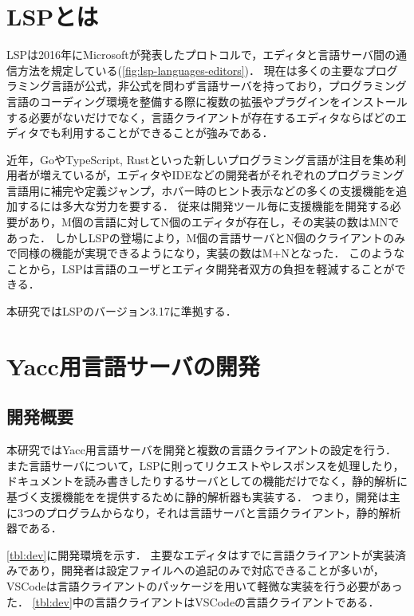 \documentclass[fontsize=9bp,twocolumn,column_gap=2.36zw,a4paper,report]{jlreq}
\begin{document}
\begin{figure}[h]
\end{figure}

\chapter{LSPとは}

LSPは2016年にMicrosoftが発表したプロトコルで，エディタと言語サーバ間の通信方法を規定している(\ref{fig:lsp-languages-editors})．
現在は多くの主要なプログラミング言語が公式，非公式を問わず言語サーバを持っており\cite{lsp_impl}，プログラミング言語のコーディング環境を整備する際に複数の拡張やプラグインをインストールする必要がないだけでなく，言語クライアントが存在するエディタならばどのエディタでも利用することができることが強みである．\par
近年，GoやTypeScript, Rustといった新しいプログラミング言語が注目を集め利用者が増えているが，エディタやIDEなどの開発者がそれぞれのプログラミング言語用に補完や定義ジャンプ，ホバー時のヒント表示などの多くの支援機能を追加するには多大な労力を要する．
従来は開発ツール毎に支援機能を開発する必要があり，M個の言語に対してN個のエディタが存在し，その実装の数はM\times Nであった．
しかしLSPの登場により，M個の言語サーバとN個のクライアントのみで同様の機能が実現できるようになり，実装の数はM+Nとなった．
このようなことから，LSPは言語のユーザとエディタ開発者双方の負担を軽減することができる．\par
本研究ではLSPのバージョン3.17に準拠する．
\newline

\chapter{Yacc用言語サーバの開発}
\section{開発概要}

本研究ではYacc用言語サーバを開発と複数の言語クライアントの設定を行う．
また言語サーバについて，LSPに則ってリクエストやレスポンスを処理したり，ドキュメントを読み書きしたりするサーバとしての機能だけでなく，静的解析に基づく支援機能をを提供するために静的解析器も実装する．
つまり，開発は主に3つのプログラムからなり，それは言語サーバと言語クライアント，静的解析器である．\par
\ref{tbl:dev}に開発環境を示す．
主要なエディタはすでに言語クライアントが実装済みであり，開発者は設定ファイルへの追記のみで対応できることが多いが，VSCodeは言語クライアントのパッケージを用いて軽微な実装を行う必要があった．
\ref{tbl:dev}中の言語クライアントはVSCodeの言語クライアントである．
\end{document}
